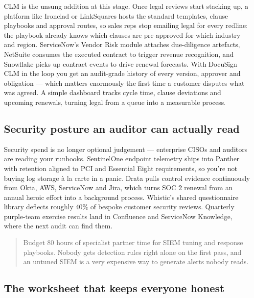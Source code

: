 CLM is the unsung addition at this stage. Once legal reviews start stacking up, a platform like Ironclad or LinkSquares hosts the standard templates, clause playbooks and approval routes, so sales reps stop emailing legal for every redline: the playbook already knows which clauses are pre-approved for which industry and region. ServiceNow's Vendor Risk module attaches due-diligence artefacts, NetSuite consumes the executed contract to trigger revenue recognition, and Snowflake picks up contract events to drive renewal forecasts. With DocuSign CLM in the loop you get an audit-grade history of every version, approver and obligation — which matters enormously the first time a customer disputes what was agreed. A simple dashboard tracks cycle time, clause deviations and upcoming renewals, turning legal from a queue into a measurable process.



\subsection{Security posture an auditor can actually read}


Security spend is no longer optional judgement — enterprise CISOs and auditors are reading your runbooks. SentinelOne endpoint telemetry ships into Panther with retention aligned to PCI and Essential Eight requirements, so you're not buying log storage à la carte in a panic. Drata pulls control evidence continuously from Okta, AWS, ServiceNow and Jira, which turns SOC 2 renewal from an annual heroic effort into a background process. Whistic's shared questionnaire library deflects roughly 40\% of bespoke customer security reviews. Quarterly purple-team exercise results land in Confluence and ServiceNow Knowledge, where the next audit can find them.



\begin{quote}\small
Budget 80 hours of specialist partner time for SIEM tuning and response playbooks. Nobody gets detection rules right alone on the first pass, and an untuned SIEM is a very expensive way to generate alerts nobody reads.
\end{quote}



\subsection{The worksheet that keeps everyone honest}


